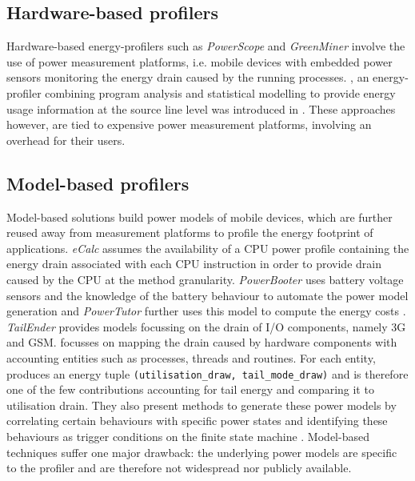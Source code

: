 \subsection{Hardware-based profilers}

Hardware-based energy-profilers such as \textit{PowerScope} 
\cite{flinn1999powerscope} and \textit{GreenMiner} 
\cite{hindle2014greenminer} involve the use of power measurement 
platforms, i.e. mobile devices with embedded power sensors monitoring 
the energy drain caused by the running processes. \vlens{}, an 
energy-profiler combining program analysis and statistical modelling to 
provide energy usage information at the source line level was introduced 
in \cite{li2013calculating}. These approaches however, are tied to 
expensive power measurement platforms, involving an overhead for their 
users.

\subsection{Model-based profilers}

Model-based solutions build power models of mobile devices, which are 
further reused away from measurement platforms to profile the energy 
footprint of applications. \textit{eCalc} \cite{hao2012estimating} 
assumes the availability of a CPU power profile containing the energy 
drain associated with each CPU instruction in order to provide drain 
caused by the CPU at the method granularity. \textit{PowerBooter} uses 
battery voltage sensors and the knowledge of the battery behaviour to 
automate the power model generation and \textit{PowerTutor} further uses 
this model to compute the energy costs \cite{zhang2010accurate}. 
\textit{TailEnder} provides models focussing on the drain of I/O 
components, namely 3G and GSM. \eprof{} \cite{pathak2012energy} focusses 
on mapping the drain caused by hardware components with accounting 
entities such as processes, threads and routines. For each entity, 
\eprof{} produces an energy tuple \texttt{(utilisation\_draw, 
tail\_mode\_draw)} and is therefore one of the few contributions 
accounting for tail energy and comparing it to utilisation drain. They 
also present methods to generate these power models by correlating 
certain behaviours with specific power states and identifying these 
behaviours as trigger conditions on the finite state machine 
\cite{pathak2011fine}. Model-based techniques suffer one major drawback: 
the underlying power models are specific to the profiler and are 
therefore not widespread nor publicly available.

